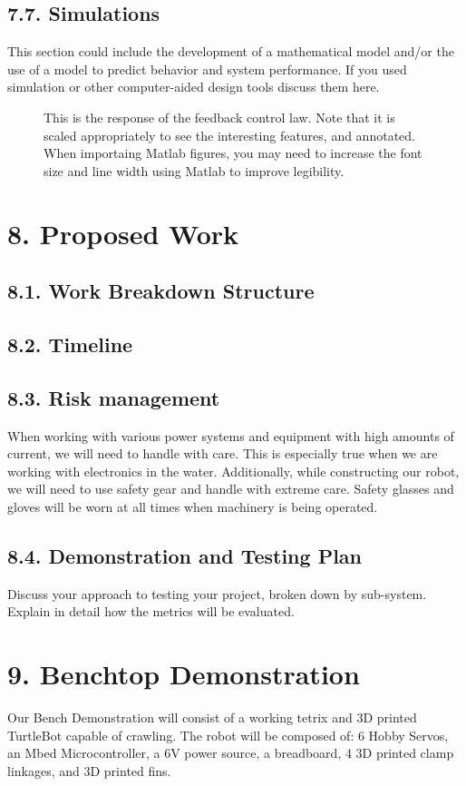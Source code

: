 \documentclass[10pt]{article}
\begin{document}
\subsection{7.7. Simulations}
This section could include the development of a mathematical model and/or the use of a model to predict behavior and system performance.  If you used simulation or other computer-aided design tools discuss them here. 
\begin{figure}
\caption{This is the response of the feedback control law.   Note that it is scaled appropriately to see the interesting features, and annotated.   When importaing Matlab figures, you may need to increase the font size and line width using Matlab to improve legibility.}
\label{fig:5} %
\end{figure}

\section{8. Proposed Work}
\subsection{8.1. Work Breakdown Structure}
\subsection{8.2. Timeline}
\subsection{8.3. Risk management}
When working with various power systems and equipment with high amounts of current, we will need to handle with care. This is especially true when we are working with electronics in the water. Additionally, while constructing our robot, we will need to use safety gear and handle with extreme care. Safety glasses and gloves will be worn at all times when machinery is being operated. 

\subsection{8.4. Demonstration and Testing Plan}
Discuss your approach to testing your project, broken down by sub-system.
Explain in detail how the metrics will be evaluated. 

\section{9. Benchtop Demonstration}
Our Bench Demonstration will consist of a working tetrix and 3D printed TurtleBot capable of crawling. The robot will be composed of: 6 Hobby Servos, an Mbed Microcontroller, a 6V power source, a breadboard, 4 3D printed clamp linkages, and 3D printed fins. 
\end{document}
